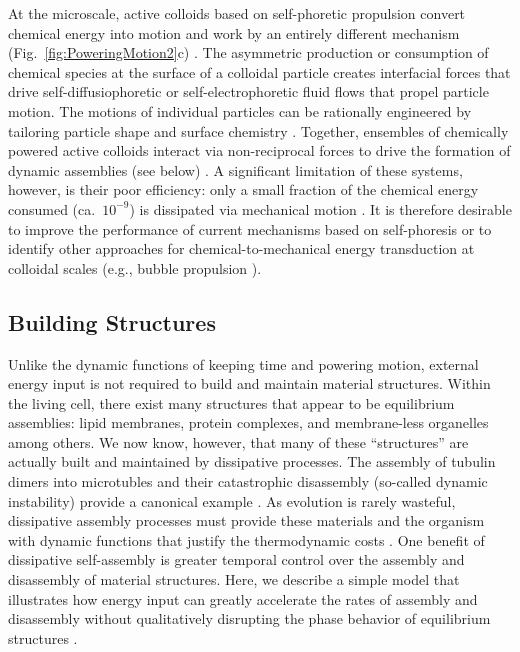 \begin{appendices}
At the microscale, active colloids based on self-phoretic propulsion convert chemical energy into motion and work by an entirely different mechanism (Fig.~\ref{fig:PoweringMotion2}c) . The asymmetric production or consumption of chemical species at the surface of a colloidal particle creates interfacial forces that drive self-diffusiophoretic or self-electrophoretic fluid flows that propel particle motion.  The motions of individual particles can be rationally engineered by tailoring particle shape and surface chemistry \autocite{brooks2019shape}.  Together, ensembles of chemically powered active colloids interact via non-reciprocal forces to drive the formation of dynamic assemblies (see below) \autocite{wang2015one, Lowen2018}.  A significant limitation of these systems, however, is their poor efficiency: only a small fraction of the chemical energy consumed (ca.~$10^{-9}$) is dissipated via mechanical motion \autocite{wang2013understanding}. It is therefore desirable to improve the performance of current mechanisms based on self-phoresis or to identify other approaches for chemical-to-mechanical energy transduction at colloidal scales (e.g., bubble propulsion \autocite{li2016rocket}). 

\subsection{Building Structures}

Unlike the dynamic functions of keeping time and powering motion, external energy input is not required to build and maintain material structures.  Within the living cell, there exist many structures that appear to be equilibrium assemblies: lipid membranes, protein complexes, and membrane-less organelles among others.  We now know, however, that many of these ``structures'' are actually built and maintained by dissipative processes.  The assembly of tubulin dimers into microtubles and their catastrophic disassembly (so-called dynamic instability) provide a canonical example \autocite{Desai1997}. As evolution is rarely wasteful, dissipative assembly processes must provide these materials and the organism with dynamic functions that justify the thermodynamic costs \autocite{Ragazzon2018}. One benefit of dissipative self-assembly \autocite{De2018} is greater temporal control over the assembly and disassembly of material structures.  Here, we describe a simple model that illustrates how energy input can greatly accelerate the rates of assembly and disassembly without qualitatively disrupting the phase behavior of equilibrium structures \autocite{marsland2018active}. 


\end{appendices}
